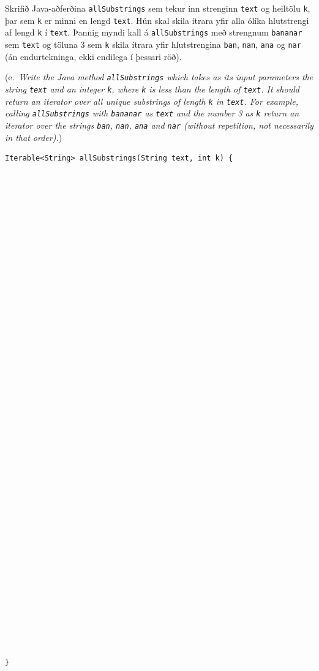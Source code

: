 \documentclass[addpoints]{exam}
\newcommand{\eng}[1]{(e.\ \emph{#1})}
\begin{document}
\begin{questions}


	\newpage
	\question[4] Skrifið Java-aðferðina \texttt{allSubstrings} sem tekur inn strenginn \texttt{text} og heiltölu \texttt{k}, þar sem \texttt{k} er minni en lengd \texttt{text}.
	Hún skal skila ítrara yfir alla ólíka hlutstrengi af lengd \texttt{k} í \texttt{text}. Þannig myndi kall á \texttt{allSubstrings} með strengnum \texttt{bananar} sem \texttt{text} og töluna 3 sem \texttt{k} skila ítrara yfir hlutstrengina \texttt{ban},  \texttt{nan}, \texttt{ana} og \texttt{nar} (án endurtekninga, ekki endilega í þessari röð).

	\eng{Write the Java method \texttt{allSubstrings} which takes as its input parameters the string \texttt{text} and an integer \texttt{k}, where \texttt{k} is less than the length of \texttt{text}.
		It should return an iterator over all unique substrings of length \texttt{k} in \texttt{text}. For example, calling \texttt{allSubstrings} with \texttt{bananar} as \texttt{text} and the number 3 as \texttt{k} return an iterator over the strings \texttt{ban},  \texttt{nan}, \texttt{ana} and \texttt{nar} (without repetition, not necessarily in that order).}

	\begin{verbatim}
Iterable<String> allSubstrings(String text, int k) {









































}
\end{verbatim}




\end{questions}
\end{document}

